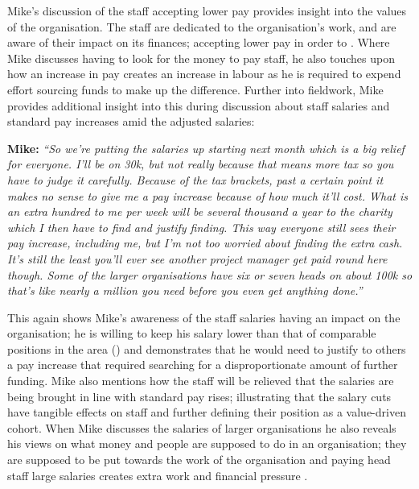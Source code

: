 Mike's discussion of the staff accepting lower pay provides insight into the values of the organisation. The staff are dedicated to the organisation's work, and are aware of their impact on its finances; accepting lower pay in order to . Where Mike discusses having to look for the money to pay staff, he also touches upon how an increase in pay creates an increase in labour as he is required to expend effort sourcing funds to make up the difference. Further into fieldwork, Mike provides additional insight into this during discussion about staff salaries and standard pay increases amid the adjusted salaries:

\textbf{Mike:} \textit{``So we're putting the salaries up starting next month which is a big relief for everyone. I'll be on 30k, but not really because that means more tax so you have to judge it carefully. Because of the tax brackets, past a certain point it makes no sense to give me a pay increase because of how much it'll cost. What is an extra hundred to me per week will be several thousand a year to the charity which I then have to find and justify finding. This way everyone still sees their pay increase, including me, but I'm not too worried about finding the extra cash. It's still the least you'll ever see another project manager get paid round here though. Some of the larger organisations have six or seven heads on about 100k so that's like nearly a million you need before you even get anything done.''}

This again shows Mike's awareness of the staff salaries having an impact on the organisation; he is willing to keep his salary lower than that of comparable positions in the area () and demonstrates that he would need to justify to others a pay increase that required searching for a disproportionate amount of further funding. Mike also mentions how the staff will be relieved that the salaries are being brought in line with standard pay rises; illustrating that the salary cuts have tangible effects on staff and further defining their position as a value-driven cohort. When Mike discusses the salaries of larger organisations he also reveals his views on what money and people are supposed to do in an organisation; they are supposed to be put towards the work of the organisation and paying head staff large salaries creates extra work and financial pressure .

